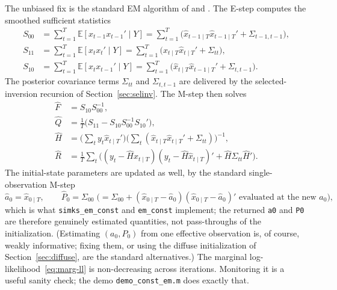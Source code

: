 \documentclass[11pt]{article}
\newcommand{\E}{\mathbb E}
\begin{document}
The unbiased fix is the standard EM algorithm of \citet{ShumwayStoffer1982}
and \citet{Watson1983}.  The E-step computes the smoothed sufficient
statistics
\begin{align}
S_{00} &= \sum_{t=1}^T \E[x_{t-1}x_{t-1}'\mid Y] = \sum_{t=1}^T \bigl(\widehat x_{t-1\mid T}\widehat x_{t-1\mid T}'+\Sigma_{t-1,t-1}\bigr),\\
S_{11} &= \sum_{t=1}^T \E[x_tx_t'\mid Y] = \sum_{t=1}^T \bigl(\widehat x_{t\mid T}\widehat x_{t\mid T}'+\Sigma_{tt}\bigr),\\
S_{10} &= \sum_{t=1}^T \E[x_tx_{t-1}'\mid Y] = \sum_{t=1}^T \bigl(\widehat x_{t\mid T}\widehat x_{t-1\mid T}'+\Sigma_{t,t-1}\bigr).
\end{align}
The posterior covariance terms $\Sigma_{tt}$ and $\Sigma_{t,t-1}$ are
delivered by the selected-inversion recursion of Section~\ref{sec:selinv}.
The M-step then solves
\begin{align}
\widehat F &= S_{10}S_{00}^{-1},\\
\widehat Q &= \tfrac1T\bigl(S_{11}-S_{10}S_{00}^{-1}S_{10}'\bigr),\\
\widehat H &= \bigl(\textstyle\sum_t y_t\widehat x_{t\mid T}'\bigr)\bigl(\textstyle\sum_t (\widehat x_{t\mid T}\widehat x_{t\mid T}'+\Sigma_{tt})\bigr)^{-1},\\
\widehat R &= \tfrac1T\textstyle\sum_t \bigl((y_t-\widehat H\widehat x_{t\mid T})(y_t-\widehat H\widehat x_{t\mid T})' + \widehat H\Sigma_{tt}\widehat H'\bigr).
\end{align}
The initial-state parameters are updated as well, by the standard
\citet{ShumwayStoffer1982} single-observation M-step
\begin{equation}
\widehat a_0=\widehat x_{0\mid T},
\qquad
\widehat P_0=\Sigma_{00}
\;\bigl(=\Sigma_{00}+(\widehat x_{0\mid T}-\widehat a_0)(\widehat x_{0\mid T}-\widehat a_0)'
\text{ evaluated at the new } \widehat a_0\bigr),
\end{equation}
which is what \texttt{simks\_em\_const} and \texttt{em\_const}
implement; the returned \texttt{a0} and \texttt{P0} are therefore
genuinely estimated quantities, not pass-throughs of the
initialization.  (Estimating $(a_0,P_0)$ from one effective
observation is, of course, weakly informative; fixing them, or using
the diffuse initialization of Section~\ref{sec:diffuse}, are the
standard alternatives.)
The marginal log-likelihood~\eqref{eq:marg-ll} is non-decreasing across
iterations.  Monitoring it is a useful sanity check; the demo
\texttt{demo\_const\_em.m} does exactly that.
\end{document}
